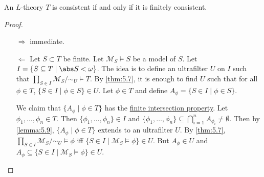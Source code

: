 \documentclass{article}
\let\models\vDash
\begin{document}
\begin{nthm}[Compactness] \label{thm:5.11}
An $L$-theory $T$ is consistent if and only if it is finitely consistent.
\end{nthm}
\begin{proof}
\begin{itemize}
\item[$\Rightarrow$] immediate.
\item[$\Leftarrow$] Let $S \subset T$ be finite. Let $\mathcal{M}_S \models S$ be a model of $S$. Let $I = \{S \subseteq T \mid \abs S < \omega\}$. The idea is to define an ultrafilter $U$ on $I$ such that $\prod_{S \in I} \mathcal{M}_S / {\sim_U} \models T$. By \cref{thm:5.7}, it is enough to find $U$ such that for all $\phi \in T$, $\{S \in I \mid \phi \in S\} \in U$. Let $\phi \in T$ and define $A_\phi = \{S \in I \mid \phi \in S\}$.

We claim that  $\{A_\phi \mid \phi \in T\}$ has the \hyperlink{fip}{finite intersection property}.
Let $\phi_1, \dots, \phi_n \in T$. Then $\{\phi_1, \dots, \phi_n \} \in I$ and $\{\phi_1, \dots, \phi_n \} \subseteq \bigcap_{i=1}^n A_{\phi_i} \neq \emptyset$. Then by \cref{lemma:5.9}, $\{A_\phi \mid \phi \in T\}$ extends to an ultrafilter $U$. By \cref{thm:5.7}, $\prod_{S \in I} \mathcal{M}_S / {\sim_U} \models \phi$ iff $\{S \in I \mid \mathcal{M}_S \models \phi\} \in U$. But $A_\phi \in U$ and $A_\phi \subseteq \{S \in I \mid \mathcal{M}_S \models \phi\} \in U$.
\end{itemize}
\end{proof}
\end{document}
